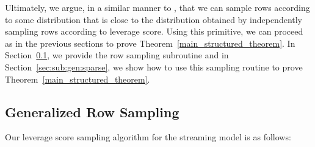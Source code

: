 \documentclass[11pt]{article}
\newcommand{\bv}[1]{\mathbf{#1}}
\begin{document}
Ultimately, we argue, in a similar manner to \cite{KP12}, that we can sample rows according to some distribution that is close to the distribution obtained by independently sampling rows according to leverage score. Using this primitive, we can proceed as in the previous sections to prove Theorem~\ref{main_structured_theorem}. In Section~\ref{sec:sub:gen:row}, we provide the row sampling subroutine and in Section~\ref{sec:sub:gen:sparse}, we show how to use this sampling routine to prove Theorem~\ref{main_structured_theorem}. 


\subsection{Generalized Row Sampling}
\label{sec:sub:gen:row}
Our leverage score sampling algorithm for the streaming model is as follows:


\newcommand{\strlev}{\tilde{\tau}}
\newcommand{\vxst}{\bv{x}_s^{(t)}}
\newcommand{\vxsit}{\bv{x}_{s_i}^{(t)}}
\newcommand{\vxsiti}{\bv{x}_{s_i}^{(t_i)}}
\newcommand{\xsit}{\bv{x}_{s_i}^{(t)}}
\newcommand{\xsiti}{\bv{x}_{s_i}^{(t_i)}}
\end{document}

